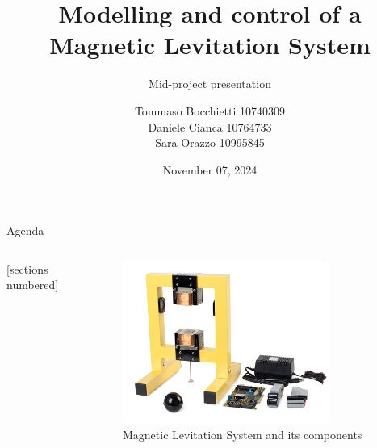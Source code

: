 \documentclass[9pt]{beamer}
\title{Modelling and control of a Magnetic Levitation System}
\subtitle{Mid-project presentation}
\date{November 07, 2024}
\author{Tommaso Bocchietti 10740309 \\ Daniele Cianca 10764733 \\ Sara Orazzo 10995845}
\institute{Politecnico di Milano}
\begin{document}
\maketitle

\begin{frame}{Agenda}

    \begin{columns}[c, onlytextwidth]

        \begin{column}{0.3\textwidth}

            [sections numbered]
            \tableofcontents

        \end{column}

        \begin{column}{0.7\textwidth}

            \begin{figure}[H]
                \centering
                \includegraphics[width=0.8\textwidth]{img/maglev_and_components.jpg}
                \caption{Magnetic Levitation System and its components}
            \end{figure}

        \end{column}

    \end{columns}

\end{frame}

% 





\appendix
\end{document}
